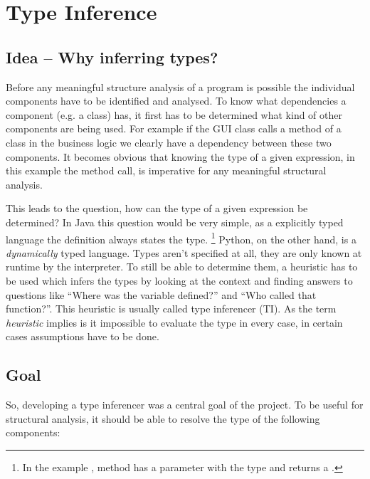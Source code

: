 \documentclass[12pt,halfparskip,DIV11,BCOR10mm]{scrreprt}
\begin{document}
\section{Type Inference}

\subsection{Idea – Why inferring types?}

Before any meaningful structure analysis of a program is possible the individual components have to be identified and analysed. To know what dependencies a component (e.g. a class) has, it first has to be determined what kind of other components are being used. For example if the GUI class calls a method of a class in the business logic we clearly have a dependency between these two components. It becomes obvious that knowing the type of a given expression, in this example the method call, is imperative for any meaningful structural analysis.


This leads to the question, how can the type of a given expression be determined? In Java this question would be very simple, as a explicitly typed language the definition always states the type.
\footnote{In the example , method  has a parameter  with the type  and returns a .} Python, on the other hand, is a \emph{dynamically} typed language. Types aren't specified at all, they are only known at runtime by the interpreter. To still be able to determine them, a heuristic has to be used which infers the types by looking at the context and finding answers to questions like ``Where was the variable defined?'' and ``Who called that function?''. This heuristic is usually called type inferencer (TI). As the term \emph{heuristic} implies is it impossible to evaluate the type in every case, in certain cases assumptions have to be done.


\subsection{Goal}

So, developing a type inferencer was a central goal of the project. To be useful for structural analysis, it should be able to resolve the type of the following components:
\end{document}
